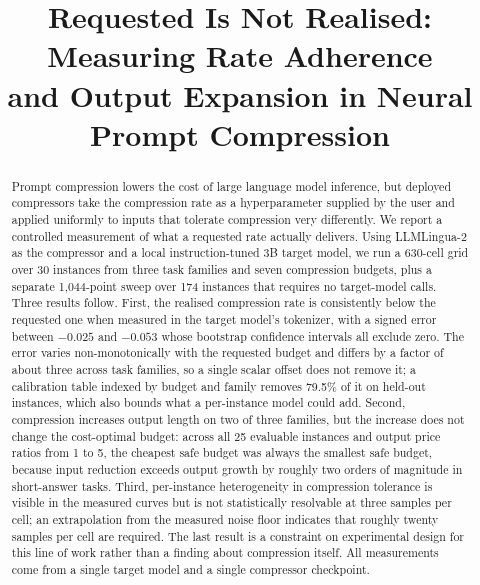 \documentclass[conference]{IEEEtran}
\begin{document}
\title{Requested Is Not Realised: Measuring Rate Adherence\\
and Output Expansion in Neural Prompt Compression}

\author{
}

\maketitle

\begin{abstract}
Prompt compression lowers the cost of large language model inference, but
deployed compressors take the compression rate as a hyperparameter supplied by
the user and applied uniformly to inputs that tolerate compression very
differently. We report a controlled measurement of what a requested rate
actually delivers. Using LLMLingua-2 as the compressor and a local
instruction-tuned 3B target model, we run a 630-cell grid over 30 instances
from three task families and seven compression budgets, plus a separate
1{,}044-point sweep over 174 instances that requires no target-model calls.
Three results follow. First, the realised compression rate is consistently
below the requested one when measured in the target model's tokenizer, with a
signed error between $-0.025$ and $-0.053$ whose bootstrap confidence
intervals all exclude zero. The error varies non-monotonically with the
requested budget and differs by a factor of about three across task families,
so a single scalar offset does not remove it; a calibration table indexed by
budget and family removes 79.5\% of it on held-out instances, which also
bounds what a per-instance model could add. Second, compression
increases output length on two of three families, but the increase does not
change the cost-optimal budget: across all 25 evaluable instances and output
price ratios from 1 to 5, the cheapest safe budget was always the smallest
safe budget, because input reduction exceeds output growth by roughly two
orders of magnitude in short-answer tasks. Third, per-instance heterogeneity
in compression tolerance is visible in the measured curves but is not
statistically resolvable at three samples per cell; an extrapolation from the
measured noise floor indicates that roughly twenty samples per cell are
required. The last result is a constraint on experimental design for this line
of work rather than a finding about compression itself. All measurements come
from a single target model and a single compressor checkpoint.
\end{abstract}
\end{document}
